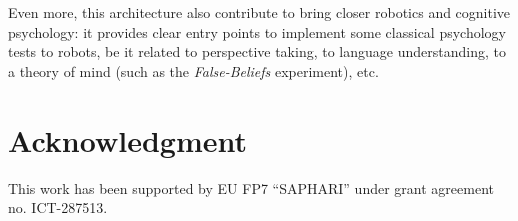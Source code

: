 \documentclass[letterpaper, 10 pt, conference]{ieeeconf}  %
\begin{document}
Even more, this architecture also contribute to bring closer robotics and
cognitive psychology: it provides clear entry points to implement some
classical psychology tests to robots, be it related to perspective taking, to
language understanding, to a theory of mind (such as the \emph{False-Beliefs}
experiment), etc.

\section*{Acknowledgment}

This work has been supported by EU FP7 ``SAPHARI'' under grant agreement no. ICT-287513.



\end{document}
